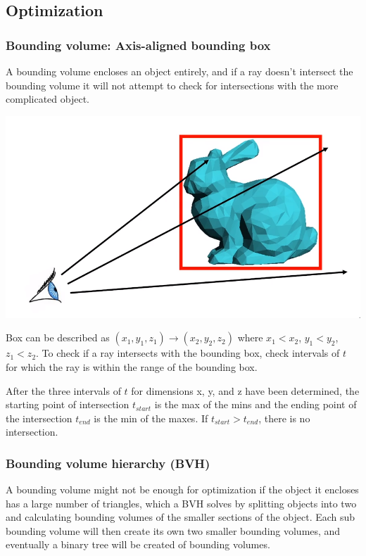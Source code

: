 \documentclass[12pt]{article}
\begin{document}
\subsection{Optimization}

\subsubsection{Bounding volume: Axis-aligned bounding box}

A bounding volume encloses an object entirely, and if a ray
doesn't intersect the bounding volume it will not attempt to
check for intersections with the more complicated object.

\includegraphics[scale=2]{images/bounding-volume.png}

Box can be described as $(x_1,y_1,z_1) \rightarrow (x_2,y_2,z_2)$ where
$x_1 < x_2$, $y_1 < y_2$, $z_1 < z_2$. To check if a ray intersects
with the bounding box, check intervals of $t$ for which the ray is
within the range of the bounding box.

After the three intervals of $t$ for dimensions x, y, and z have been
determined, the starting point of intersection $t_{start}$ is the max of the mins
and the ending point of the intersection $t_{end}$ is the min of the maxes.
If $t_{start} > t_{end}$, there is no intersection.

\subsubsection{Bounding volume hierarchy (BVH)}

A bounding volume might not be enough for optimization if the object
it encloses has a large number of triangles, which a BVH solves by
splitting objects into two and calculating bounding volumes of the smaller
sections of the object. Each sub bounding volume will then create its
own two smaller bounding volumes, and eventually a binary tree will
be created of bounding volumes.
\end{document}
